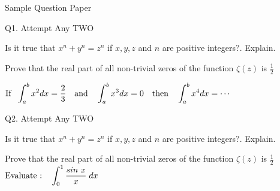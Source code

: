 \documentclass[12pt]{exam}
\begin{document}
\begin{center} Sample Question Paper 
\end{center}


\begin{flushleft} Q1. Attempt Any TWO \end{flushleft}
\begin{questions}
\question[3] Is it true that \(x^n + y^n = z^n\) if \(x,y,z\) and \(n\) are
positive integers?. Explain.
 
\question[4] Prove that the real part of all non-trivial zeros of the function
\(\zeta(z)\) is \(\frac{1}{2}\)
 
\question[4] $\begin{aligned}[t] 
\text{If \ } \int_{a}^{b} x^2 dx = \frac{2}{3} 
\text{\quad and\quad} 
\int_{a}^{b} x^3 dx = 0 
\text{\quad then\quad}
\int_{a}^{b} x^4 dx = \cdots
\end{aligned}$
\end{questions}

\begin{flushleft} Q2. Attempt Any TWO \end{flushleft}

\begin{questions}
\question[3] Is it true that \(x^n + y^n = z^n\) if \(x,y,z\) and \(n\) are
positive integers?. Explain.
 
\question[4] Prove that the real part of all non-trivial zeros of the function
\(\zeta(z)\) is \(\frac{1}{2}\)
\question[4] 
$\begin{aligned}[t] 
\text{Evaluate :\quad} \int_{0}^{1} \frac{sin\ x}{x}\;dx
\end{aligned}$
\end{questions}
\end{document}
